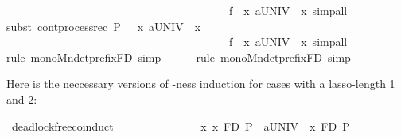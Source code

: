 \begin{isabellebody}
\ \ \ \ \ \ \ \ \ \ \ \ \ \ \ \ \ \ \ \ \ \ \ \ \ \ \ \ \ \ \ \ \ \ \ \ \ \ \ \ f\ {\isacharequal}{\kern0pt}\ {\isacartoucheopen}{\isasymlambda}x{\isachardot}{\kern0pt}\ {\isasymsqinter}a{\isasymin}UNIV\ {\isasymrightarrow}\ x{\isacartoucheclose}{\isacharbrackright}{\kern0pt}{\isacharcomma}{\kern0pt}\ simp{\isacharunderscore}{\kern0pt}all{\isacharparenright}{\kern0pt}\isanewline
\ \ \ \ \isamarkupfalse%
{\isacharparenleft}{\kern0pt}subst\ cont{\isacharunderscore}{\kern0pt}process{\isacharunderscore}{\kern0pt}rec{\isacharbrackleft}{\kern0pt}\ P\ {\isacharequal}{\kern0pt}\ {\isacartoucheopen}{\isacharparenleft}{\kern0pt}{\isasymmu}\ x{\isachardot}{\kern0pt}\ {\isasymsqinter}a{\isasymin}UNIV\ {\isasymrightarrow}\ x{\isacharparenright}{\kern0pt}{\isacartoucheclose}\ \isanewline
\ \ \ \ \ \ \ \ \ \ \ \ \ \ \ \ \ \ \ \ \ \ \ \ \ \ \ \ \ \ \ \ \ \ \ \ \ \ \ \ f\ {\isacharequal}{\kern0pt}\ {\isacartoucheopen}{\isasymlambda}x{\isachardot}{\kern0pt}\ {\isasymsqinter}a{\isasymin}UNIV\ {\isasymrightarrow}\ x{\isacartoucheclose}{\isacharbrackright}{\kern0pt}{\isacharcomma}{\kern0pt}\ simp{\isacharunderscore}{\kern0pt}all{\isacharparenright}{\kern0pt}\isanewline
\ \ \ \ \isamarkupfalse%
{\isacharparenleft}{\kern0pt}rule\ mono{\isacharunderscore}{\kern0pt}Mndetprefix{\isacharunderscore}{\kern0pt}FD{\isacharcomma}{\kern0pt}\ simp{\isacharparenright}{\kern0pt}\ \isanewline
\ \ \ \ \isamarkupfalse%
{\isacharparenleft}{\kern0pt}rule\ mono{\isacharunderscore}{\kern0pt}Mndetprefix{\isacharunderscore}{\kern0pt}FD{\isacharcomma}{\kern0pt}\ simp{\isacharparenright}{\kern0pt}\ \isanewline
{}\isamarkupfalse%
%
\endisatagproof
{\isafoldproof}%
%
\isadelimproof
%
\endisadelimproof
%
\begin{isamarkuptext}%
Here is the neccessary versions of -ness induction for
cases with a lasso-length 1 and 2:%
\end{isamarkuptext}\isamarkuptrue%
\isamarkupfalse%
\ deadlock{\isacharunderscore}{\kern0pt}free{\isacharunderscore}{\kern0pt}{}{\isacharunderscore}{\kern0pt}coinduct\ {\isacharcolon}{\kern0pt}\isanewline
\ \ \ \ \ \ \ \ \ \ {\isacartoucheopen}\ \ \ \ {\isacharparenleft}{\kern0pt}{\isasymAnd}x{\isachardot}{\kern0pt}\ x\ {\isasymsqsubseteq}\isactrlsub F\isactrlsub D\ P\ {\isasymLongrightarrow}\ {\isasymsqinter}a{\isasymin}UNIV\ {\isasymrightarrow}\ x\ {\isasymsqsubseteq}\isactrlsub F\isactrlsub D\ P{\isacharparenright}{\kern0pt}\isanewline

\end{isabellebody}
